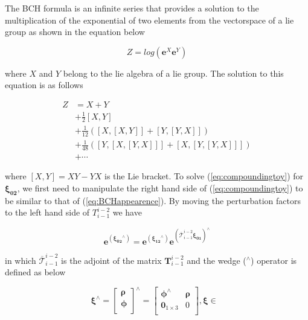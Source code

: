 \documentclass[letterpaper, 10 pt]{ieeeconf}  %
\begin{document}
The BCH formula is an infinite series that provides a solution to the multiplication of the exponential of two elements from the vectorspace of a lie group as shown in the equation below

\begin{equation}
Z=log(\boldsymbol{e}^{X}\boldsymbol{e}^{Y}) 
\label{eq:BCHappearence}
\end{equation}

where $X$ and $Y$ belong to the lie algebra of a lie group. The solution to this equation is as follows \cite{Klarsfeld1989bch}

\begin{equation}
\begin{aligned}
Z &=X+Y \\
&+\frac{1}{2}[X, Y] \\
&+\frac{1}{12}([X,[X, Y]]+[Y,[Y, X]]) \\
&+\frac{1}{48}([Y,[X,[Y, X]]]+[X,[Y,[Y, X]]]) \\
&+\cdots
\end{aligned}
\label{eq:BCHgeneralsolution}
\end{equation}

where $[X, Y]=XY-YX$ is the Lie bracket. To solve (\ref{eq:compoundingtoy}) for $\boldsymbol{\xi_{02}}$, we first need to manipulate the right hand side of (\ref{eq:compoundingtoy}) to be similar to that of (\ref{eq:BCHappearence}). By moving the perturbation factors to the left hand side of $T^{i-2}_{i-1}$ we have

\begin{equation}
\boldsymbol{e}^{(\boldsymbol{\xi_{02}}^{\wedge})}=\boldsymbol{e}^{(\boldsymbol{\xi_{12}}^{\wedge})} \boldsymbol{e}^ {(\overline{\mathcal{T}}^{i-2}_{i-1} \boldsymbol{\xi_{01}})^{\wedge}}
\label{eq:compoundingBCH}
\end{equation}

in which $\overline{\mathcal{T}}^{i-2}_{i-1}$ is the adjoint of the matrix $\boldsymbol{T}^{i-2}_{i-1}$ and the wedge ($^\wedge$) operator is defined as below

\begin{equation}
\boldsymbol{\xi}^\wedge = 
\begin{bmatrix}
\boldsymbol{\rho} \\
\boldsymbol{\phi} \\
\end{bmatrix}^\wedge = 
\begin{bmatrix}
\boldsymbol{\phi}^\wedge & \boldsymbol{\rho} \\
\mathbf{0}_{1\times 3}& 0\\
\end{bmatrix}, \boldsymbol{\xi} \in \mathop{\mathbb{R}^6}
\label{eq:wedgeoperation}
\end{equation}
\end{document}
